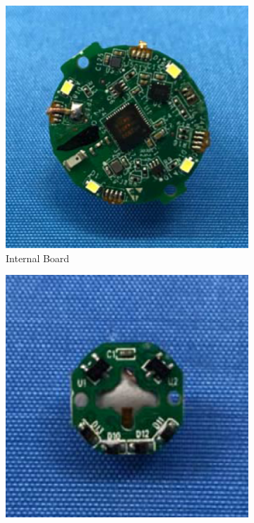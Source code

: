 \begin{figure}[h]
    \centering
    \begin{subfigure}{0.25\textwidth}
        \centering
        \includegraphics[width=.90\linewidth]{Figures/3 State of the Art/gocube-core.png}
        \caption{Internal Board}
        \label{fig:gocube-core}
    \end{subfigure}%
    \begin{subfigure}{0.25\textwidth}
        \centering
        \includegraphics[width=.90\linewidth]{Figures/3 State of the Art/gocube-cap-chip.png}

\end{subfigure}
\end{figure}
